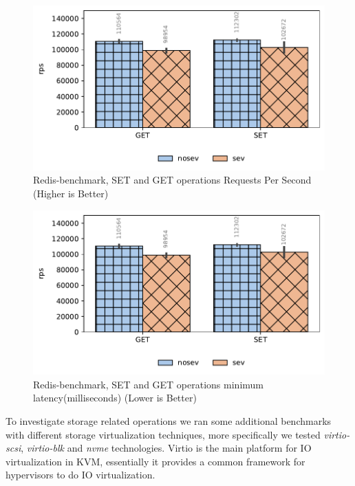 \documentclass[twocolumn]{article}
\begin{document}
\begin{figure}[ht]
    \centering
    \includegraphics[width=\columnwidth]{img/redis.pdf}
    \caption{Redis-benchmark, SET and GET operations Requests Per Second (Higher is Better)}
    \label{fig:tb-redis}
\end{figure}

\begin{figure}[ht]
    \centering
    \includegraphics[width=\columnwidth]{img/redis.pdf}
    \caption{Redis-benchmark, SET and GET operations minimum latency(milliseconds) (Lower is Better)}
    \label{fig:tb-redis-latency}
\end{figure}

To investigate storage related operations we ran some additional benchmarks with different storage virtualization techniques, more specifically we tested \textit{virtio-scsi}, \textit{virtio-blk} and \textit{nvme} technologies. Virtio is the main platform for IO virtualization in KVM, essentially it provides a common framework for hypervisors to do IO virtualization.
\end{document}
